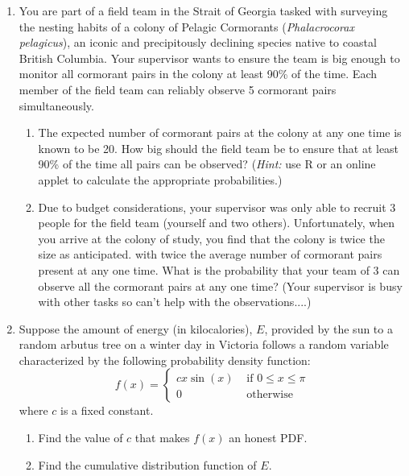 \documentclass[11pt]{article}
\begin{document}
\begin{enumerate}[label=\textbf{Question \arabic*:},start=1]
\vspace*{3mm}

\item You are part of a field team in the Strait of Georgia tasked with surveying the nesting habits of a colony of Pelagic Cormorants ({\em Phalacrocorax pelagicus}), an iconic and precipitously declining species native to coastal British Columbia. Your supervisor wants to ensure the team is big enough to monitor all cormorant pairs in the colony at least 90\% of the time. Each member of the field team can reliably observe 5 cormorant pairs simultaneously. 
\begin{enumerate}
\item The expected number of cormorant pairs at the colony at any one time is known to be 20. How big should the field team be to ensure that at least 90\% of the time all pairs can be observed? 
({\em Hint:} use R or an online applet to calculate the appropriate probabilities.)

\item Due to budget considerations, your supervisor was only able to recruit 3 people for the field team (yourself and two others). Unfortunately, when you arrive at the colony of study, you find that the colony is twice the size as anticipated. with twice the average number of cormorant pairs present at any one time. What is the probability that your team of 3 can observe all the cormorant pairs at any one time? (Your supervisor is busy with other tasks so can't help with the observations....) 
\end{enumerate}




\item Suppose the amount of energy (in kilocalories), $E$, provided by the sun to a random arbutus tree on a winter day in Victoria follows a random variable characterized by the following probability density function:
\[
f(x) = \left\{
\begin{array}{ll}
cx\sin(x) & \mbox{ if } 0\leq x\leq \pi \\
0 & \mbox{ otherwise} 
\end{array}
\right.
\]
where $c$ is a fixed constant. 
\begin{enumerate}
  \item Find the value of $c$ that makes $f(x)$ an honest PDF.\\

  \item Find the cumulative distribution function of $E$.\\


\end{enumerate}
\end{enumerate}
\end{document}
